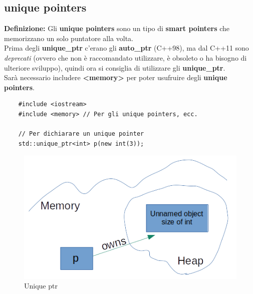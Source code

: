 
\subsection{unique pointers}

\textsf{\small \textbf{Definizione: } Gli \textbf{unique pointers} sono un tipo di \textbf{smart pointers} che memorizzano un solo puntatore alla volta.} \\

\textsf{\small Prima degli \textbf{unique\_ptr} c'erano gli \textbf{auto\_ptr} (C++98), ma dal C++11 sono \emph{deprecati} (ovvero che non è raccomandato utilizzare, è obsoleto o ha bisogno di ulteriore sviluppo), quindi ora si consiglia di utilizzare gli \textbf{unique\_ptr}. } \\

\textsf{\small Sarà necessario includere \textbf{<memory>} per poter usufruire degli \textbf{unique pointers}.} \\

\begin{lstlisting}
	#include <iostream>
	#include <memory> // Per gli unique pointers, ecc.
	
	// Per dichiarare un unique pointer
	std::unique_ptr<int> p(new int(3));
\end{lstlisting}

\newpage %

\begin{figure}[H]
	\centering
	\includegraphics[width=1\textwidth, height=1\textheight, keepaspectratio]{./imgs/unique_ptr_definition.png}
	\caption{Unique ptr}
	\label{fig:unique_ptr_definition}
\end{figure}

